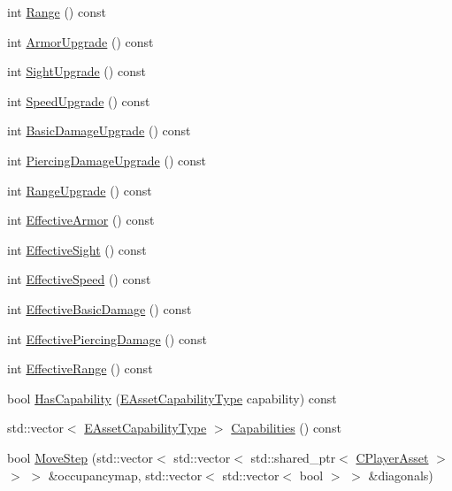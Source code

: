 \begin{DoxyCompactItemize}
\item 
int \hyperlink{classCPlayerAsset_a717695212dd7159bd0b6e97d4ae5cf9b}{Range} () const
\item 
int \hyperlink{classCPlayerAsset_a1312cb77efe2cf732cc255a8345e7c44}{Armor\+Upgrade} () const
\item 
int \hyperlink{classCPlayerAsset_aaa297dbacfa25d61ce2b3498ed139c5b}{Sight\+Upgrade} () const
\item 
int \hyperlink{classCPlayerAsset_a6b6b17c9d4b1fe095120032bee4977af}{Speed\+Upgrade} () const
\item 
int \hyperlink{classCPlayerAsset_affad00c05e4a1325601f2dc23df1cf05}{Basic\+Damage\+Upgrade} () const
\item 
int \hyperlink{classCPlayerAsset_af7403a6a0eab4eaedd2b04d66e21d601}{Piercing\+Damage\+Upgrade} () const
\item 
int \hyperlink{classCPlayerAsset_aad35da7eb13a1d5830471a0f6de5090e}{Range\+Upgrade} () const
\item 
int \hyperlink{classCPlayerAsset_a1bceaff561a420eaa8924eeb421fd594}{Effective\+Armor} () const
\item 
int \hyperlink{classCPlayerAsset_a69a1226429ded98b31fde2623d0058bf}{Effective\+Sight} () const
\item 
int \hyperlink{classCPlayerAsset_af6d10fcbbd9cc861ced9ba3a85d387ab}{Effective\+Speed} () const
\item 
int \hyperlink{classCPlayerAsset_a13b40b2b670c86fb2d1f319837eca2da}{Effective\+Basic\+Damage} () const
\item 
int \hyperlink{classCPlayerAsset_a180f67342aa933dbf0918759714858e3}{Effective\+Piercing\+Damage} () const
\item 
int \hyperlink{classCPlayerAsset_af2a2747655729e3a58586f28ddd7cd8d}{Effective\+Range} () const
\item 
bool \hyperlink{classCPlayerAsset_ac01bc82d9b4cc54a72cb092fa1368663}{Has\+Capability} (\hyperlink{GameDataTypes_8h_a35b98ce26aca678b03c6f9f76e4778ce}{E\+Asset\+Capability\+Type} capability) const
\item 
std\+::vector$<$ \hyperlink{GameDataTypes_8h_a35b98ce26aca678b03c6f9f76e4778ce}{E\+Asset\+Capability\+Type} $>$ \hyperlink{classCPlayerAsset_adf61d7228fa5d665156d111be5a49d6f}{Capabilities} () const
\item 
bool \hyperlink{classCPlayerAsset_a4c8ef6c0049b48045c2ba95d398dbc05}{Move\+Step} (std\+::vector$<$ std\+::vector$<$ std\+::shared\+\_\+ptr$<$ \hyperlink{classCPlayerAsset}{C\+Player\+Asset} $>$ $>$ $>$ \&occupancymap, std\+::vector$<$ std\+::vector$<$ bool $>$ $>$ \&diagonals)
\end{DoxyCompactItemize}
